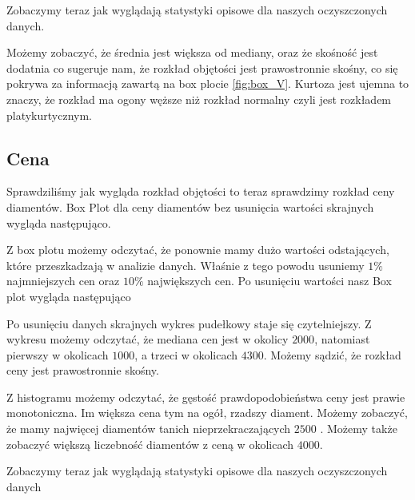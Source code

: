 \documentclass[12pt]{article}
\theoremstyle{exer}
\begin{document}
	Zobaczymy teraz jak wyglądają statystyki opisowe dla naszych oczyszczonych danych.
	
	\begin{table}[H]
		\caption{Podstawowe statystyki opisowe dla objętości.}
		\label{tab:statystyki_V}
	\end{table}
	Możemy zobaczyć, że średnia jest większa  od mediany, oraz że skośność jest dodatnia co sugeruje nam, że rozkład objętości jest prawostronnie skośny, co się pokrywa za informacją zawartą na box plocie \ref{fig:box_V}. Kurtoza jest ujemna to znaczy, że rozkład ma ogony węższe niż rozkład normalny czyli jest rozkładem platykurtycznym. 
	
	\subsection{Cena}
	Sprawdziliśmy jak wygląda rozkład objętości to teraz sprawdzimy rozkład ceny diamentów.
	Box Plot dla ceny diamentów bez usunięcia wartości skrajnych wygląda następująco.
	
	Z box plotu możemy odczytać, że ponownie mamy dużo wartości odstających, które przeszkadzają w analizie danych. Właśnie z tego powodu usuniemy $ 1 \% $ najmniejszych cen oraz  $ 10\%$ największych cen.
	Po usunięciu wartości nasz Box plot wygląda następująco

	Po usunięciu danych skrajnych wykres pudełkowy staje się czytelniejszy. Z wykresu możemy odczytać, że mediana cen jest w okolicy $2000$, natomiast pierwszy w okolicach $1000$, a trzeci w okolicach $4300$. Możemy sądzić, że rozkład ceny jest prawostronnie skośny.
	

 Z histogramu możemy odczytać, że gęstość prawdopodobieństwa ceny jest prawie monotoniczna. Im większa cena tym na ogół, rzadszy diament. Możemy zobaczyć, że mamy najwięcej diamentów tanich nieprzekraczających $2500$ . Możemy także zobaczyć większą liczebność diamentów z ceną w okolicach $4000$. 
 
		Zobaczymy teraz jak wyglądają statystyki opisowe dla naszych oczyszczonych danych
	
\end{document}
